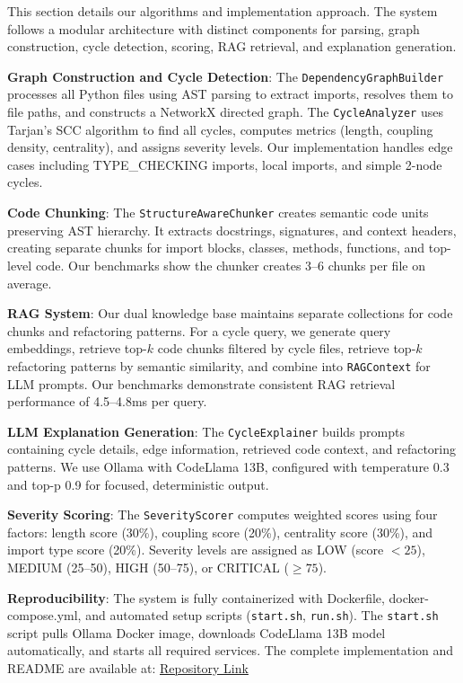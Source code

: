 \documentclass[paper=a4, fontsize=11pt]{scrartcl} %
\begin{document}
This section details our algorithms and implementation approach. The system follows a modular architecture with distinct components for parsing, graph construction, cycle detection, scoring, RAG retrieval, and explanation generation.

\textbf{Graph Construction and Cycle Detection}: The \texttt{DependencyGraphBuilder} processes all Python files using AST parsing to extract imports, resolves them to file paths, and constructs a NetworkX directed graph. The \texttt{CycleAnalyzer} uses Tarjan's SCC algorithm to find all cycles, computes metrics (length, coupling density, centrality), and assigns severity levels. Our implementation handles edge cases including TYPE\_CHECKING imports, local imports, and simple 2-node cycles.

\textbf{Code Chunking}: The \texttt{StructureAwareChunker} creates semantic code units preserving AST hierarchy. It extracts docstrings, signatures, and context headers, creating separate chunks for import blocks, classes, methods, functions, and top-level code. Our benchmarks show the chunker creates 3--6 chunks per file on average.

\textbf{RAG System}: Our dual knowledge base maintains separate collections for code chunks and refactoring patterns. For a cycle query, we generate query embeddings, retrieve top-$k$ code chunks filtered by cycle files, retrieve top-$k$ refactoring patterns by semantic similarity, and combine into \texttt{RAGContext} for LLM prompts. Our benchmarks demonstrate consistent RAG retrieval performance of 4.5--4.8ms per query.

\textbf{LLM Explanation Generation}: The \texttt{CycleExplainer} builds prompts containing cycle details, edge information, retrieved code context, and refactoring patterns. We use Ollama with CodeLlama 13B, configured with temperature 0.3 and top-p 0.9 for focused, deterministic output.

\textbf{Severity Scoring}: The \texttt{SeverityScorer} computes weighted scores using four factors: length score (30\%), coupling score (20\%), centrality score (30\%), and import type score (20\%). Severity levels are assigned as LOW (score $< 25$), MEDIUM (25--50), HIGH (50--75), or CRITICAL ($\geq 75$).

\textbf{Reproducibility}: The system is fully containerized with Dockerfile, docker-compose.yml, and automated setup scripts (\texttt{start.sh}, \texttt{run.sh}). The \texttt{start.sh} script pulls Ollama Docker image, downloads CodeLlama 13B model automatically, and starts all required services. The complete implementation and README are available at: \href{https://github.com/your-repo/Code-Circular-Dependency-Detection}{Repository Link}
\end{document}
